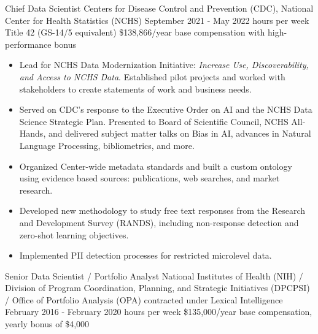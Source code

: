 \documentclass[]{scrartcl}
\begin{document}
\begin{cleanCV}
{\begin{itemize}
  \end{itemize}
}

\vspace{1em}

    
  \WorkExperience
{}
{Chief Data Scientist}
{
  \newline Centers for Disease Control and Prevention (CDC), National Center for
Health Statistics (NCHS)
  \newline September 2021 - May 2022
   hours per week
  \newline Title 42 (GS-14/5 equivalent) \$138,866/year base compensation with high-performance bonus 
}
{
  \vspace{-0.25em}
  \begin{itemize}

   \item Lead for NCHS Data Modernization Initiative: \emph{Increase Use, Discoverability, and Access to NCHS Data}. Established pilot projects and worked with stakeholders to create statements of work and business needs.
   \item Served on CDC's response to the Executive Order on AI and the NCHS Data Science Strategic Plan. Presented to Board of Scientific Council, NCHS All-Hands, and delivered subject matter talks on Bias in AI, advances in Natural Language Processing, bibliometrics, and more.
   \item Organized Center-wide metadata standards and built a custom ontology using evidence based sources: publications, web searches, and market research.
   \item Developed new methodology to study free text responses from the Research and Development Survey (RANDS), including non-response detection and zero-shot learning objectives.
   \item Implemented PII detection processes for restricted microlevel data.
  \end{itemize}
}
  
  \WorkExperience
{}
{Senior Data Scientist / Portfolio Analyst}
{
  \newline National Institutes of Health (NIH) / Division of Program Coordination, Planning, and Strategic Initiatives (DPCPSI) / Office of Portfolio Analysis (OPA) contracted under Lexical Intelligence
  \newline February 2016 - February 2020
   hours per week
  \newline \$135,000/year base compensation, yearly bonus of \$4,000
}
{
  \vspace{-0.25em}
  \begin{itemize}
    

\end{itemize}}
\end{cleanCV}
\end{document}
